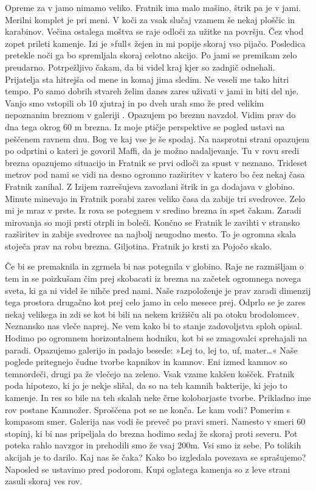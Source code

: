   Opreme za v jamo nimamo veliko. Fratnik ima malo mašino, štrik pa je v jami. Merilni komplet je pri meni. V koči za vsak slučaj vzamem še nekaj ploščic in karabinov. Večina ostalega moštva se raje odloči za užitke na površju. Čez vhod zopet prileti kamenje. Izi je »full« žejen in mi popije skoraj vso pijačo. Posledica pretekle noči ga bo spremljala skoraj celotno akcijo. Po jami se premikam zelo preudarno. Potrpežljivo čakam, da bi videl kraj kjer so zadnjič odnehali. Prijatelja sta hitrejša od mene in komaj jima sledim. Ne veseli me tako hitri tempo. Po samo dobrih stvareh želim danes zares uživati v jami in biti del nje. Vanjo smo vstopili ob 10  zjutraj in po dveh urah smo že pred velikim nepoznanim breznom v galeriji . Opazujem po breznu navzdol. Vidim prav do dna tega okrog 60 m brezna. Iz moje ptičje perspektive se pogled ustavi na peščenem ravnem dnu. Bog ve kaj vse je še spodaj. Na nasprotni strani opazujem po odprtini o kateri je govoril Maffi, da je možno nadaljevanje. Tu v rovu sredi brezna opazujemo situacijo in Fratnik se prvi odloči za spust v neznano. Trideset metrov pod nami se vidi na desno ogromno razširitev v katero bo čez nekaj časa Fratnik zanihal. Z Izijem razrešujeva zavozlani štrik in ga dodajava v globino. Minute minevajo in Fratnik porabi zares veliko časa da zabije tri svedrovce. Zelo mi je mraz v prste. Iz rova se potegnem v sredino brezna in spet čakam. Zaradi mirovanja so moji prsti otrpli in boleči. Končno se Fratnik le zavihti v stransko razširitev in zabije svedrovec na najbolj neugodno mesto. To je ogromna skala stoječa prav na robu brezna. Giljotina. Fratnik jo krsti za Pojočo skalo. 

Če bi se premaknila in zgrmela bi nas potegnila v globino. Raje ne razmišljam o tem in se poizkušam čim prej skobacati iz brezna na začetek ogromnega novega sveta, ki ga ni videl še nihče pred nami. Naše razpoloženje je prav zaradi dimenzij tega prostora drugačno kot prej celo jamo in celo mesece prej. Odprlo se je zares nekaj velikega in zdi se kot bi bili na nekem križišču ali pa otoku brodolomcev. Neznansko nas vleče naprej. Ne vem kako bi to stanje zadovoljstva sploh opisal. Hodimo po ogromnem horizontalnem hodniku, kot bi se zmagovalci sprehajali na paradi. Opazujemo galerijo in padajo besede: »Lej to, lej to, uf, mater…« Naše poglede pritegnejo čudne tvorbe kapnikov in kamnov. Eni izmed kamnov so temnordeči, drugi pa že vlečejo na zeleno. Vsak vzame kakšen košček. Fratnik poda hipotezo, ki jo je nekje slišal, da so na teh kamnih bakterije, ki jejo to kamenje. In res so bile na teh skalah neke črne kolobarjaste tvorbe. Prikladno ime rov postane Kamnožer.  Sproščena pot se ne konča. Le kam vodi? Pomerim s kompasom smer. Galerija nas vodi še preveč po pravi smeri. Namesto v smeri 60 stopinj, ki bi nas pripeljala do brezna  hodimo sedaj že skoraj proti severu. Pot poteka rahlo navzgor in prehodili smo že vsaj 200m. Vsi smo iz sebe. Po tolikih akcijah je to darilo. Kaj nas še čaka? Kako bo izgledala povezava se sprašujemo? Naposled se ustavimo pred podorom. Kupi oglatega kamenja so z leve strani zasuli skoraj ves rov. 

